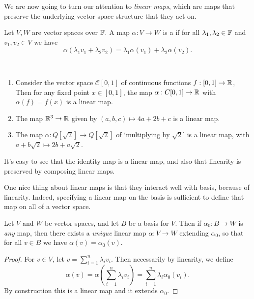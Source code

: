 \documentclass[a4paper]{scrartcl}
\begin{document}
We are now going to turn our attention to \emph{linear maps}, which are maps that preserve the underlying vector space structure that they act on.

\begin{definition}
    Let $V, W$ are vector spaces over $\mathbb{F}$.
    A map $\alpha: V \rightarrow W$ is a  if for all $\lambda_1, \lambda_2 \in \mathbb{F}$ and $v_1, v_2 \in V$ we have 
    $$
    \alpha(\lambda_1 v_1 + \lambda_2 v_2) = \lambda_1\alpha(v_1) + \lambda_2 \alpha(v_2).
    $$
\end{definition}

\begin{example}~
    \vspace{-1.5\baselineskip}
    \begin{enumerate}[label=(\roman*)]
        \item Consider the vector space $\mathcal{C}[0, 1]$ of continuous functions $f:[0, 1] \rightarrow \mathbb{R}$, Then for any fixed point $x \in [0, 1]$, the map $\alpha: C[0, 1] \rightarrow \mathbb{R}$ with $\alpha(f) = f(x)$ is a linear map.
        \item The map $\mathbb{R}^3 \rightarrow \mathbb{R}$ given by $(a, b, c) \mapsto 4a + 2b + c$ is a linear map.
        \item The map $\alpha: Q[\sqrt{2}] \rightarrow Q[\sqrt{2}]$ of `multiplying by $\sqrt{2}$' is a linear map, with $a + b \sqrt{2} \mapsto 2b + a \sqrt{2}$.
    \end{enumerate}
\end{example}

It's easy to see that the identity map is a linear map, and also that linearity is preserved by composing linear maps.

One nice thing about linear maps is that they interact well with basis, because of linearity. Indeed, specifying a linear map on the basis is sufficient to define that map on all of a vector space.

\begin{lemma}
    Let $V$ and $W$ be vector spaces, and let $B$ be a basis for $V$. Then if $\alpha_0: B \rightarrow W$ is \emph{any} map, then there exists a \emph{unique} linear map $\alpha: V \rightarrow W$ extending $\alpha_0$, so that for all $v \in B$ we have $\alpha(v) = \alpha_0(v)$.
\end{lemma}
\begin{proof}
    For $v \in V$, let $v = \sum_{i = 1}^n \lambda_i v_i$. Then necessarily by linearity, we define
    $$
    \alpha(v) = \alpha\left(\sum_{i = 1}^n \lambda_i v_i\right) = \sum_{i = 1}^n \lambda_i \alpha_0 (v_i).
    $$
    By construction this is a linear map and it extends $\alpha_0$.
\end{proof}
\end{document}
